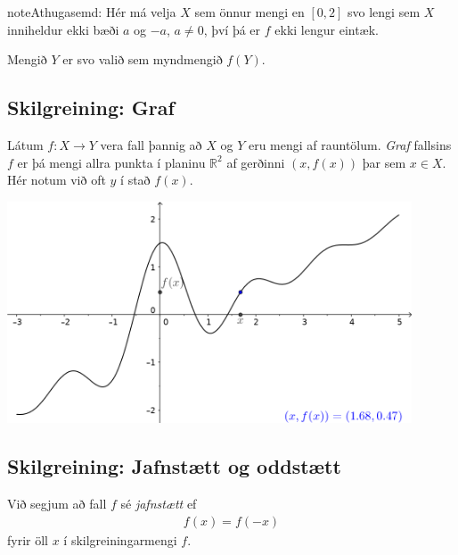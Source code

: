\documentclass[a4paper,10pt,icelandic]{sphinxmanual}
\begin{document}
\begin{sphinxadmonition}{note}{Athugasemd:}
Hér má velja \(X\) sem önnur mengi en \([0,2]\) svo lengi sem
\(X\) inniheldur ekki bæði \(a\) og \(-a\), \(a\neq 0\),
því þá er \(f\) ekki lengur eintæk.

Mengið \(Y\) er svo valið sem myndmengið \(f(Y)\).
\end{sphinxadmonition}


\subsection{Skilgreining: Graf}
\label{\detokenize{kafli01:skilgreining-graf}}
Látum \(f:X \to Y\) vera fall þannig að \(X\)
og \(Y\) eru mengi af rauntölum. \textit{Graf} fallsins \(f\) er þá
mengi allra punkta í planinu \(\mathbb{R}^2\) af gerðinni
\((x,f(x))\) þar sem \(x\in X\). Hér notum við oft \(y\) í stað
\(f(x)\).


\begin{center}
\includegraphics[width=12cm,keepaspectratio=true]{04_Graf_falls.png}
\end{center}


\ignorespaces 

\subsection{Skilgreining: Jafnstætt og oddstætt}
\label{\detokenize{kafli01:skilgreining-jafnstaett-og-oddstaett}}\label{\detokenize{kafli01:index-10}}
Við segjum að fall \(f\) sé \textit{jafnstætt} ef
\begin{equation*}
\begin{split}f(x) = f(-x)\end{split}
\end{equation*}
fyrir öll \(x\) í skilgreiningarmengi \(f\).
\end{document}
